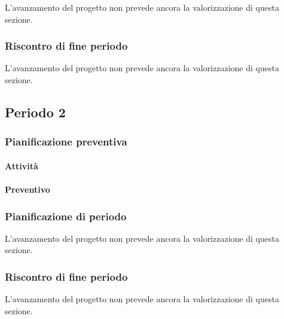 L'avanzamento del progetto non prevede ancora la valorizzazione di questa sezione.



\subsubsection{Riscontro di fine periodo}


L'avanzamento del progetto non prevede ancora la valorizzazione di questa sezione.





\subsection{Periodo 2}

\subsubsection{Pianificazione preventiva}

\paragraph{Attività}

\planningTable{
	
}

\paragraph{Preventivo}

\smallPreventivoTable{
	
}


\subsubsection{Pianificazione di periodo}

L'avanzamento del progetto non prevede ancora la valorizzazione di questa sezione.



\subsubsection{Riscontro di fine periodo}

L'avanzamento del progetto non prevede ancora la valorizzazione di questa sezione.






